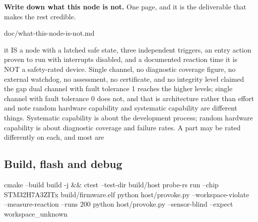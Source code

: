 \begin{steps}
\item \textbf{Write down what this node is not.} One page, and it is the
deliverable that makes the rest credible.
\begin{plaincode}
doc/what-this-node-is-not.md

  it IS        a node with a latched safe state, three independent
               triggers, an entry action proven to run with interrupts
               disabled, and a documented reaction time
  it is NOT    a safety-rated device. Single channel, no diagnostic
               coverage figure, no external watchdog, no assessment, no
               certificate, and no integrity level claimed
  the gap      dual channel with fault tolerance 1 reaches the higher
               levels; single channel with fault tolerance 0 does not, and
               that is architecture rather than effort
  and note     random hardware capability and systematic capability are
               different things. Systematic capability is about the
               development process; random hardware capability is about
               diagnostic coverage and failure rates. A part may be rated
               differently on each, and most are
\end{plaincode}
\end{steps}


\subsection*{Build, flash and debug}


\begin{shellcode}
cmake --build build -j && ctest --test-dir build/host
probe-rs run --chip STM32H7A3ZITx build/firmware.elf
python host/provoke.py --workspace-violate --measure-reaction --runs 200
python host/provoke.py --sensor-blind --expect workspace_unknown
\end{shellcode}


